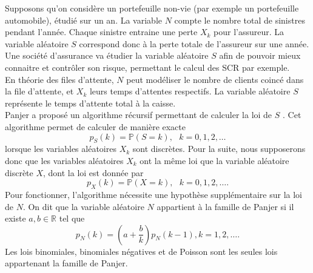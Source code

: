 \documentclass[12pt]{exam}
\begin{document}
Supposons qu'on considère un portefeuille non-vie (par exemple un portefeuille automobile), étudié sur un an. La variable $N$ compte le nombre total de sinistres pendant l'année. Chaque sinistre entraine une perte $X_{k}$ pour l'assureur. La variable aléatoire $S$ correspond donc à la perte totale de l'assureur sur une année. Une société d'assurance va étudier la variable aléatoire $S$ afin de pouvoir mieux connaitre et contrôler son risque, permettant le calcul des SCR par exemple.\\

En théorie des files d'attente, $N$ peut modéliser le nombre de clients coincé dans la file d'attente, et $X_k$ leurs temps d'attentes respectifs. La variable aléatoire $S$ représente le temps d'attente total à la caisse.\\

Panjer a proposé un algorithme récursif permettant de calculer la loi de $S$ \cite{Pa81}. Cet algorithme permet de calculer de manière exacte
\begin{equation*}
p_S(k)=\mathbb{P}(S=k),\text{ }k=0,1,2,\ldots
\end{equation*}
 lorsque les variables aléatoires $X_k$ sont discrètes. Pour la suite, nous supposerons donc que les variables aléatoires $X_{k}$ ont la même loi que la variable aléatoire discrète $X$, dont la loi est donnée par
\begin{equation*}
p_X(k)=\mathbb{P}(X=k),\text{ }k=0,1,2,\ldots.
\end{equation*}
Pour fonctionner, l'algorithme nécessite une hypothèse supplémentaire sur la loi de $N$. On dit que la variable aléatoire $N$ appartient à la famille de Panjer si il existe $a,b\in\mathbb{R}$ tel que 
\begin{equation}\label{eq:PanjerRecurrenceRelationship}
p_N(k)=\left(a+\frac{b}{k}\right)p_N(k-1),k=1,2,\ldots.
\end{equation}  
Les lois binomiales, binomiales négatives et de Poisson sont les seules lois appartenant la famille de Panjer.\\
\end{document}

